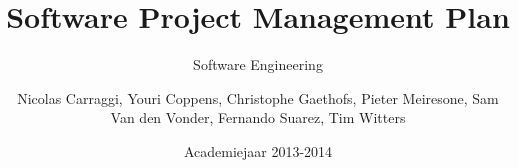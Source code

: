 \documentclass{book}
\author{Nicolas Carraggi, Youri Coppens, Christophe Gaethofs, Pieter Meiresone, Sam Van den Vonder, Fernando Suarez, Tim Witters}
\title{Software Project Management Plan}
\subtitle{Software Engineering}
\date{Academiejaar 2013-2014}
\begin{document}
\frontmatter
\makeassignment

\tableofcontents
\listoffigures
\listoftables

\mainmatter








%
\end{document}
